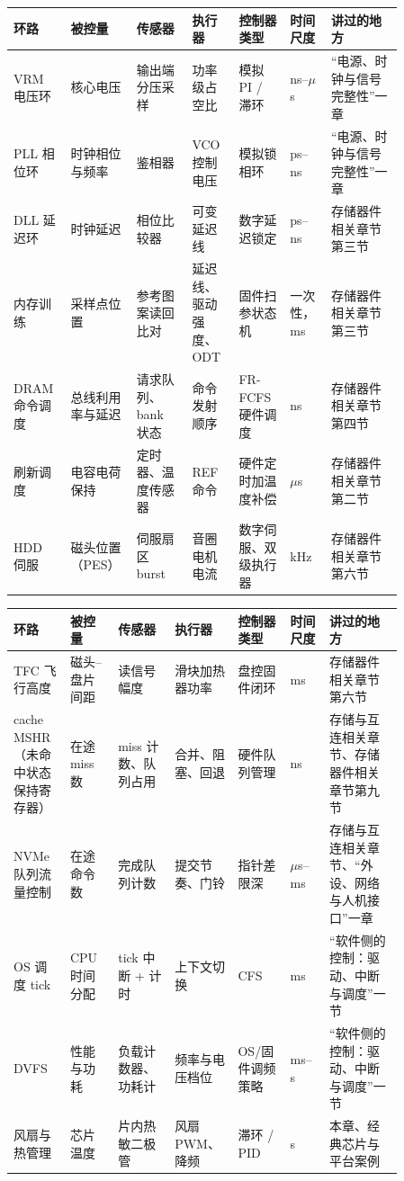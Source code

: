\begin{longtable}{L{0.13\linewidth}L{0.11\linewidth}L{0.13\linewidth}L{0.11\linewidth}L{0.12\linewidth}L{0.09\linewidth}L{0.17\linewidth}}
\toprule
环路 & 被控量 & 传感器 & 执行器 & 控制器类型 & 时间尺度 & 讲过的地方 \\
\midrule
VRM 电压环 & 核心电压 & 输出端分压采样 & 功率级占空比 & 模拟 PI / 滞环 & ns--$\mu$s & “电源、时钟与信号完整性”一章 \\\tablerowrule
PLL 相位环 & 时钟相位与频率 & 鉴相器 & VCO 控制电压 & 模拟锁相环 & ps--ns & “电源、时钟与信号完整性”一章 \\\tablerowrule
DLL 延迟环 & 时钟延迟 & 相位比较器 & 可变延迟线 & 数字延迟锁定 & ps--ns & 存储器件相关章节第三节 \\\tablerowrule
内存训练 & 采样点位置 & 参考图案读回比对 & 延迟线、驱动强度、ODT & 固件扫参状态机 & 一次性，ms & 存储器件相关章节第三节 \\\tablerowrule
DRAM 命令调度 & 总线利用率与延迟 & 请求队列、bank 状态 & 命令发射顺序 & FR-FCFS 硬件调度 & ns & 存储器件相关章节第四节 \\\tablerowrule
刷新调度 & 电容电荷保持 & 定时器、温度传感器 & REF 命令 & 硬件定时加温度补偿 & $\mu$s & 存储器件相关章节第二节 \\\tablerowrule
HDD 伺服 & 磁头位置（PES） & 伺服扇区 burst & 音圈电机电流 & 数字伺服、双级执行器 & kHz & 存储器件相关章节第六节 \\
\bottomrule
\end{longtable}

\begin{longtable}{L{0.13\linewidth}L{0.11\linewidth}L{0.13\linewidth}L{0.11\linewidth}L{0.12\linewidth}L{0.09\linewidth}L{0.17\linewidth}}
\toprule
环路 & 被控量 & 传感器 & 执行器 & 控制器类型 & 时间尺度 & 讲过的地方 \\
\midrule
TFC 飞行高度 & 磁头--盘片间距 & 读信号幅度 & 滑块加热器功率 & 盘控固件闭环 & ms & 存储器件相关章节第六节 \\\tablerowrule
cache MSHR（未命中状态保持寄存器） & 在途 miss 数 & miss 计数、队列占用 & 合并、阻塞、回退 & 硬件队列管理 & ns & 存储与互连相关章节、存储器件相关章节第九节 \\\tablerowrule
NVMe 队列流量控制 & 在途命令数 & 完成队列计数 & 提交节奏、门铃 & 指针差限深 & $\mu$s--ms & 存储与互连相关章节、“外设、网络与人机接口”一章 \\\tablerowrule
OS 调度 tick & CPU 时间分配 & tick 中断 + 计时 & 上下文切换 & CFS & ms & “软件侧的控制：驱动、中断与调度”一节 \\\tablerowrule
DVFS & 性能与功耗 & 负载计数器、功耗计 & 频率与电压档位 & OS/固件调频策略 & ms--s & “软件侧的控制：驱动、中断与调度”一节 \\\tablerowrule
风扇与热管理 & 芯片温度 & 片内热敏二极管 & 风扇 PWM、降频 & 滞环 / PID & s & 本章、经典芯片与平台案例 \\
\bottomrule
\end{longtable}


